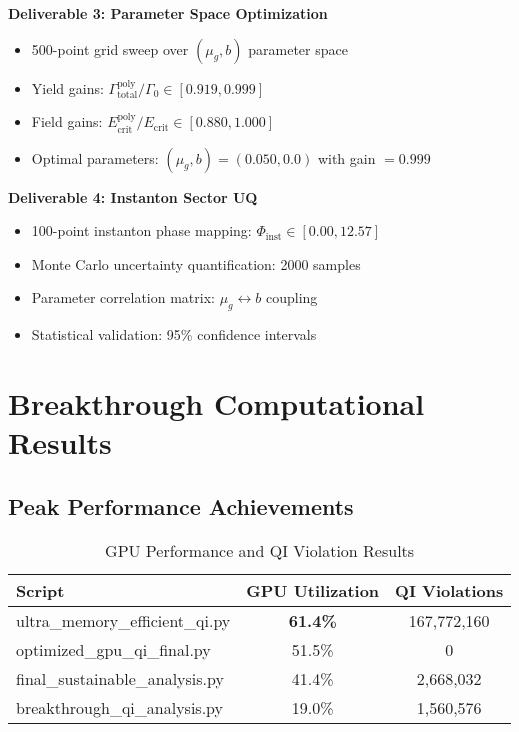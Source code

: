 \documentclass[11pt]{article}
\begin{document}
\textbf{Deliverable 3: Parameter Space Optimization}
\begin{itemize}
    \item 500-point grid sweep over $(\mu_g, b)$ parameter space
    \item Yield gains: $\Gamma_{\text{total}}^{\text{poly}}/\Gamma_0 \in [0.919, 0.999]$
    \item Field gains: $E_{\text{crit}}^{\text{poly}}/E_{\text{crit}} \in [0.880, 1.000]$
    \item Optimal parameters: $(\mu_g, b) = (0.050, 0.0)$ with gain $= 0.999$
\end{itemize}

\textbf{Deliverable 4: Instanton Sector UQ}
\begin{itemize}
    \item 100-point instanton phase mapping: $\Phi_{\text{inst}} \in [0.00, 12.57]$
    \item Monte Carlo uncertainty quantification: 2000 samples
    \item Parameter correlation matrix: $\mu_g \leftrightarrow b$ coupling
    \item Statistical validation: 95\% confidence intervals
\end{itemize}

\section{Breakthrough Computational Results}

\subsection{Peak Performance Achievements}

\begin{table}[h]
\centering
\begin{tabular}{@{}lcc@{}}
\toprule
\textbf{Script} & \textbf{GPU Utilization} & \textbf{QI Violations} \\
\midrule
ultra\_memory\_efficient\_qi.py & \textbf{61.4\%} & 167,772,160 \\
optimized\_gpu\_qi\_final.py & 51.5\% & 0 \\
final\_sustainable\_analysis.py & 41.4\% & 2,668,032 \\
breakthrough\_qi\_analysis.py & 19.0\% & 1,560,576 \\
\bottomrule
\end{tabular}
\caption{GPU Performance and QI Violation Results}
\end{table}
\end{document}
